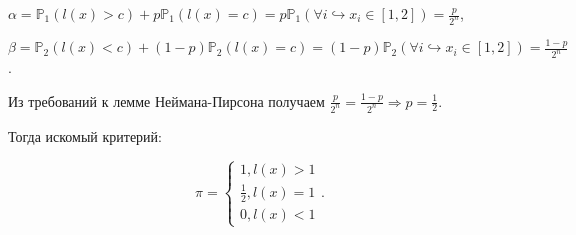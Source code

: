 \documentclass[14pt]{extarticle}
\begin{document}
$\alpha = \mathbb P_1(l(x) > c) + p\mathbb P_1(l(x) = c) = p\mathbb P_1(\forall i\hookrightarrow x_i\in[1, 2]) = \frac{p}{2^n}$,

$\beta = \mathbb P_2(l(x) < c) + (1 - p)\mathbb P_2(l(x) = c) = (1 - p)\mathbb P_2(\forall i\hookrightarrow x_i\in[1, 2]) = \frac{1 - p}{2^n}$.

Из требований к лемме Неймана-Пирсона получаем $\frac{p}{2^n} = \frac{1 - p}{2^n}\Rightarrow p = \frac{1}{2}$.

Тогда искомый критерий:

\begin{equation*}
    \pi = 
    \begin{cases}
        1, l(x) > 1\\
        \frac{1}{2}, l(x) = 1\\
        0, l(x) < 1
    \end{cases}.
\end{equation*}
\end{document}
